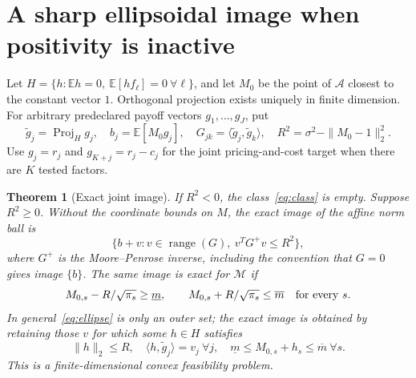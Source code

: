 \documentclass[11pt,a4paper]{article}
\newtheorem{theorem}{Theorem}[section]
\theoremstyle{definition}
\theoremstyle{remark}
\newcommand{\E}{\mathbb E}
\begin{document}
\section{A sharp ellipsoidal image when positivity is inactive}
Let $H=\{h:\E h=0,\ \E[hf_\ell]=0\ \forall\ell\}$, and let $M_0$ be the point of $\mathcal A$ closest to the constant vector $1$. Orthogonal projection exists uniquely in finite dimension. For arbitrary predeclared payoff vectors $g_1,\ldots,g_J$, put
\[
 \widetilde g_j=\operatorname{Proj}_H g_j,\quad
 b_j=\E[M_0g_j],\quad
 G_{jk}=\langle\widetilde g_j,\widetilde g_k\rangle,
 \quad R^2=\sigma^2-\|M_0-1\|_2^2.
\]
Use $g_j=r_j$ and $g_{K+j}=r_j-c_j$ for the joint pricing-and-cost target when there are $K$ tested factors.

\begin{theorem}[Exact joint image]\label{th:ellipse}
If $R^2<0$, the class~\eqref{eq:class} is empty. Suppose $R^2\geq0$. Without the coordinate bounds on $M$, the exact image of the affine norm ball is
\begin{equation}\label{eq:ellipse}
 \{b+v:v\in\operatorname{range}(G),\ v^TG^+v\leq R^2\},
\end{equation}
where $G^+$ is the Moore--Penrose inverse, including the convention that $G=0$ gives image $\{b\}$. The same image is exact for $\mathcal M$ if
\begin{equation}\label{eq:inactive}
 M_{0,s}-R/\sqrt{\pi_s}\geq\underline m,
 \qquad M_{0,s}+R/\sqrt{\pi_s}\leq\overline m
 \quad\hbox{for every }s.
\end{equation}
In general~\eqref{eq:ellipse} is only an outer set; the exact image is obtained by retaining those $v$ for which some $h\in H$ satisfies
\[
 \|h\|_2\leq R,\quad
 \langle h,\widetilde g_j\rangle=v_j\ \forall j,\quad
 \underline m\leq M_{0,s}+h_s\leq\overline m\ \forall s.
\]
This is a finite-dimensional convex feasibility problem.
\end{theorem}
\end{document}
